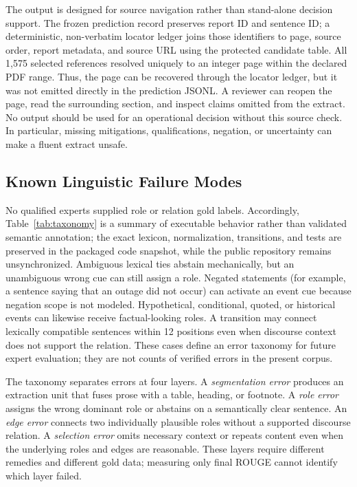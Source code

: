 \documentclass[applsci,article,submit,moreauthors]{Definitions/mdpi}
\begin{document}
The output is designed for source navigation rather than stand-alone decision support. The frozen prediction record preserves report ID and sentence ID; a deterministic, non-verbatim locator ledger joins those identifiers to page, source order, report metadata, and source URL using the protected candidate table. All 1,575 selected references resolved uniquely to an integer page within the declared PDF range. Thus, the page can be recovered through the locator ledger, but it was not emitted directly in the prediction JSONL. A reviewer can reopen the page, read the surrounding section, and inspect claims omitted from the extract. No output should be used for an operational decision without this source check. In particular, missing mitigations, qualifications, negation, or uncertainty can make a fluent extract unsafe.

\subsection{Known Linguistic Failure Modes}

No qualified experts supplied role or relation gold labels. Accordingly, Table~\ref{tab:taxonomy} is a summary of executable behavior rather than validated semantic annotation; the exact lexicon, normalization, transitions, and tests are preserved in the packaged code snapshot, while the public repository remains unsynchronized. Ambiguous lexical ties abstain mechanically, but an unambiguous wrong cue can still assign a role. Negated statements (for example, a sentence saying that an outage did not occur) can activate an event cue because negation scope is not modeled. Hypothetical, conditional, quoted, or historical events can likewise receive factual-looking roles. A transition may connect lexically compatible sentences within 12 positions even when discourse context does not support the relation. These cases define an error taxonomy for future expert evaluation; they are not counts of verified errors in the present corpus.

The taxonomy separates errors at four layers. A \textit{segmentation error} produces an extraction unit that fuses prose with a table, heading, or footnote. A \textit{role error} assigns the wrong dominant role or abstains on a semantically clear sentence. An \textit{edge error} connects two individually plausible roles without a supported discourse relation. A \textit{selection error} omits necessary context or repeats content even when the underlying roles and edges are reasonable. These layers require different remedies and different gold data; measuring only final ROUGE cannot identify which layer failed.
\end{document}
